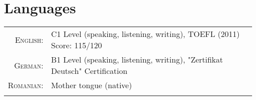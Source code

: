 \documentclass[a4paper,11pt]{article}
\begin{document}
\thispagestyle{fancy}
%
\section{Languages}
\begin{tabular}{rl}
\textsc{English:}&C1 Level (speaking, listening, writing), TOEFL (2011) Score: 115/120 \\
\textsc{German:}&B1 Level (speaking, listening, writing), "Zertifikat Deutsch" Certification\\
\textsc{Romanian:}&Mother tongue (native)\\
\multicolumn{2}{c}{} \\
\end{tabular}

%

\thispagestyle{fancy}

%
\end{document}
